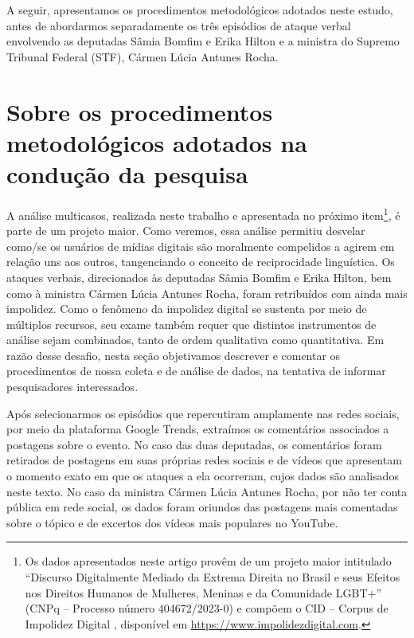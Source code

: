 \documentclass[portuguese]{textolivre}
\begin{document}
A seguir, apresentamos os procedimentos metodológicos adotados neste estudo, antes de abordarmos separadamente os três episódios de ataque verbal envolvendo as deputadas Sâmia Bomfim e Erika Hilton e a ministra do Supremo Tribunal Federal (STF), Cármen Lúcia Antunes Rocha.


\section{Sobre os procedimentos metodológicos adotados na condução da pesquisa}\label{sec-2}

A análise multicasos, realizada neste trabalho e apresentada no próximo item\footnote{Os dados apresentados neste artigo provêm de um projeto maior intitulado ``Discurso Digitalmente Mediado da Extrema Direita no Brasil e seus Efeitos nos Direitos Humanos de Mulheres, Meninas e da Comunidade LGBT+'' (CNPq – Processo número 404672/2023-0) e compõem o CID -- Corpus de Impolidez Digital \cite{oliveira2024corpus}, disponível em \url{https://www.impolidezdigital.com}.}, é parte de um projeto maior. Como veremos, essa análise permitiu desvelar como/se os usuários de mídias digitais são moralmente compelidos a agirem em relação uns aos outros, tangenciando o conceito de reciprocidade linguística. Os ataques verbais, direcionados às deputadas Sâmia Bomfim e Erika Hilton, bem como à ministra Cármen Lúcia Antunes Rocha, foram retribuídos com ainda mais impolidez. Como o fenômeno da impolidez digital se sustenta por meio de múltiplos recursos, seu exame também requer que distintos instrumentos de análise sejam combinados, tanto de ordem qualitativa como quantitativa. Em razão desse desafio, nesta seção objetivamos descrever e comentar os procedimentos de nossa coleta e de análise de dados, na tentativa de informar pesquisadores interessados.

Após selecionarmos os episódios que repercutiram amplamente nas redes sociais, por meio da plataforma Google Trends, extraímos os comentários associados a postagens sobre o evento. No caso das duas deputadas, os comentários foram retirados de postagens em suas próprias redes sociais e de vídeos que apresentam o momento exato em que os ataques a ela ocorreram, cujos dados são analisados neste texto. No caso da ministra Cármen Lúcia Antunes Rocha, por não ter conta pública em rede social, os dados foram oriundos das postagens mais comentadas sobre o tópico e de excertos dos vídeos mais populares no YouTube.
\end{document}

